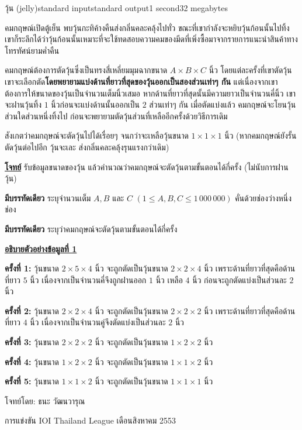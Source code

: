 \documentclass[11pt,a4paper]{article}
\begin{document}
\begin{problem}{วุ้น (jelly)}{standard input}{standard output}{1 second}{32 megabytes}

คมกฤษณ์เปิดตู้เย็น พบวุ้นกะทิค้างคืนส่งกลิ่นคละคลุ้งไปทั่ว ขณะที่เขากำลังจะหยิบวุ้นก้อนนั้นไปทิ้ง เขาก็ระลึกได้ว่าวุ้นก้อนนั้นเหมาะที่จะใช้ทดสอบความคมของมีดที่เพิ่งซื้อมาจากรายการแนะนำสินค้าทางโทรทัศน์ยามค่ำคืน

คมกฤษณ์ต้องการตัดวุ้นซึ่งเป็นทรงสี่เหลี่ยมมุมฉากขนาด $A\times B\times C$ นิ้ว โดยแต่ละครั้งที่เขาตัดวุ้น เขาจะเลือกตัด\textbf{โดยพยายามแบ่งด้านที่ยาวที่สุดของวุ้นออกเป็นสองส่วนเท่าๆ กัน} แต่เนื่องจากเขาต้องการให้ขนาดของวุ้นเป็นจำนวนเต็มนิ้วเสมอ หากด้านที่ยาวที่สุดนั้นมีความยาวเป็นจำนวนคี่นิ้ว เขาจะฝานวุ้นทิ้ง $1$ นิ้วก่อนจะแบ่งด้านนั้นออกเป็น $2$ ส่วนเท่าๆ กัน เมื่อตัดแบ่งแล้ว คมกฤษณ์จะโยนวุ้นส่วนใดส่วนหนึ่งทิ้งไป ก่อนจะพยายามตัดวุ้นส่วนที่เหลืออีกครั้งด้วยวิธีการเดิม

สังเกตว่าคมกฤษณ์จะตัดวุ้นไปได้เรื่อยๆ จนกว่าจะเหลือวุ้นขนาด $1\times 1\times 1$ นิ้ว (หากคมกฤษณ์ยังรั้นตัดวุ้นต่อไปอีก วุ้นจะเละ ส่งกลิ่นคละคลุ้งรุนแรงกว่าเดิม)

\underline{\textbf{โจทย์}} รับข้อมูลขนาดของวุ้น แล้วคำนวณว่าคมกฤษณ์จะตัดวุ้นตามขั้นตอนได้กี่ครั้ง (ไม่นับการฝานวุ้น)

\InputFile

\textbf{มีบรรทัดเดียว}  ระบุจำนวนเต็ม $A, B$ และ $C$ $(1 \leq A,B,C \leq 1\,000\,000)$ คั่นด้วยช่องว่างหนึ่งช่อง

\OutputFile

\textbf{มีบรรทัดเดียว} ระบุว่าคมกฤษณ์จะตัดวุ้นตามขั้นตอนได้กี่ครั้ง

\Examples

\begin{example}
%
%
\end{example}
\newpage
\Note 

\underline{\textbf{อธิบายตัวอย่างข้อ}}\textbf{มู}\underline{\textbf{ลที่ 1}}

\textbf{ครั้งที่ 1: }วุ้นขนาด $2\times 5\times 4$ นิ้ว จะถูกตัดเป็นวุ้นขนาด $2\times 2\times 4$ นิ้ว เพราะด้านที่ยาวที่สุดคือด้านที่ยาว $5$ นิ้ว เนื่องจากเป็นจำนวนคี่จึงถูกฝานออก $1$ นิ้ว เหลือ $4$ นิ้ว ก่อนจะถูกตัดแบ่งเป็นส่วนละ $2$ นิ้ว

\textbf{ครั้งที่ 2:} วุ้นขนาด $2\times 2\times 4$ นิ้ว จะถูกตัดเป็นวุ้นขนาด $2\times 2\times 2$ นิ้ว เพราะด้านที่ยาวที่สุดคือด้านที่ยาว $4$ นิ้ว เนื่องจากเป็นจำนวนคู่จึงตัดแบ่งเป็นส่วนละ $2$ นิ้ว

\textbf{ครั้งที่ 3: }วุ้นขนาด $2\times 2\times 2$ นิ้ว จะถูกตัดเป็นวุ้นขนาด $1\times 2\times 2$ นิ้ว

\textbf{ครั้งที่ 4:} วุ้นขนาด $1\times 2\times 2$ นิ้ว จะถูกตัดเป็นวุ้นขนาด $1\times 1\times 2$ นิ้ว

\textbf{ครั้งที่ 5:} วุ้นขนาด $1\times 1\times 2$ นิ้ว จะถูกตัดเป็นวุ้นขนาด $1\times 1\times 1$ นิ้ว

\Source

โจทย์โดย: ธนะ วัฒนวารุณ

การแข่งขัน IOI Thailand League เดือนสิงหาคม 2553

\end{problem}
\end{document}
